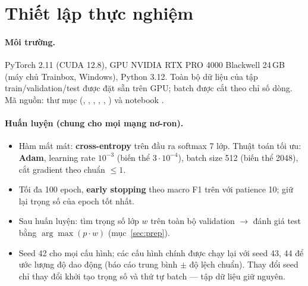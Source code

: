\section{Thiết lập thực nghiệm}\label{sec:setup}

\paragraph{Môi trường.} PyTorch 2.11 (CUDA 12.8), GPU NVIDIA RTX PRO 4000 Blackwell 24\,GB (máy chủ Trainbox, Windows), Python 3.12.
Toàn bộ dữ liệu của tập train/validation/test được đặt sẵn trên GPU; batch được cắt theo chỉ số dòng. Mã nguồn: thư mục 
(, , , , , ) và notebook
.

\paragraph{Huấn luyện (chung cho mọi mạng nơ-ron).}
\begin{itemize}
\item Hàm mất mát: \textbf{cross-entropy} trên đầu ra softmax 7 lớp. Thuật toán tối ưu: \textbf{Adam}, learning rate $10^{-3}$
  (biến thể $3\cdot10^{-4}$), batch size 512 (biến thể 2048), cắt gradient theo chuẩn $\le 1$.
\item Tối đa 100 epoch, \textbf{early stopping} theo macro F1 trên  với patience 10; giữ lại trọng số của epoch tốt nhất.
\item Sau huấn luyện: tìm trọng số lớp $w$ trên toàn bộ validation $\to$ đánh giá test bằng $\arg\max(p\cdot w)$ (mục~\ref{sec:prep}).
\item Seed 42 cho mọi cấu hình; các cấu hình chính được chạy lại với seed 43, 44 để ước lượng độ dao động
  (báo cáo trung bình $\pm$ độ lệch chuẩn). Thay đổi seed chỉ thay đổi khởi tạo trọng số và thứ tự batch --- tập dữ liệu giữ nguyên.
\end{itemize}

